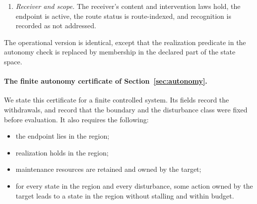 \begin{enumerate}
Lemma~\ref{lem:strategy}, with these instantiations:
\begin{itemize}
\item the entries are the registers reached by one step after a genuine
arrival;
\item the withdrawal removes all six declared roles, and keeps removed and
retained resources disjoint;
\item the realization predicate is realization together with membership in the
declared region and acceptance of the run's assignment;
\item the resource conditions require target ownership, retention and a
positive balance of every required resource, with the source absent and a
writer present;
\item legal moves are owned by the target, use only retained resources, and are
affordable;
\item the transition law requires resource closure, exact balance updates, and
strict advance of order, ticks, progress and records.
\end{itemize}
Responses are listed in a sparse format. At every generated play and for
every disturbance, every listed weight of the selected response is positive.
Unselected actions are not constrained.
\item \emph{Receiver and scope.} The receiver's content and intervention laws
hold, the endpoint is active, the route status is route-indexed, and
recognition is recorded as not addressed.
\end{enumerate}
The operational version is identical, except that the realization predicate in
the autonomy check is replaced by membership in the declared part of the state
space.

\paragraph{The finite autonomy certificate of Section~\ref{sec:autonomy}.}
We state this certificate for a finite controlled system. Its fields record the
withdrawals, and record that the boundary and the disturbance class were fixed
before evaluation. It also requires the following:
\begin{itemize}
\item the endpoint lies in the region;
\item realization holds in the region;
\item maintenance resources are retained and owned by the target;
\item for every state in the region and every disturbance, some
action owned by the target leads to a state in the region without stalling and within budget.
\end{itemize}
